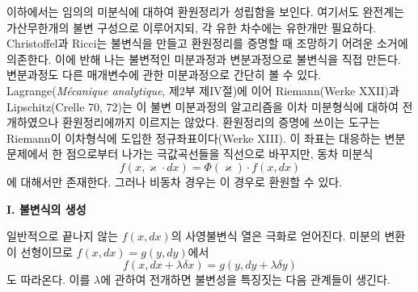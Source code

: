 이하에서는 임의의 미분식에 대하여 \glqq{}환원정리\grqq{}가 성립함을 보인다. 여기서도 완전계는 가산무한개의 불변 구성으로 이루어지되, 각 유한 차수에는 유한개만 필요하다. Christoffel과 Ricci는 불변식을 만들고 환원정리를 증명할 때 조망하기 어려운 소거에 의존한다. 이에 반해 나는 불변적인 미분과정과 변분과정으로 불변식을 직접 만든다. 변분과정도 다른 매개변수에 관한 미분과정으로 간단히 볼 수 있다. Lagrange(\emph{Mécanique analytique}, 제2부 제IV절)에 이어 Riemann(Werke XXII)과 Lipschitz(Crelle 70, 72)는 이 불변 미분과정의 알고리즘을 이차 미분형식에 대하여 전개하였으나 환원정리에까지 이르지는 않았다. 환원정리의 증명에 쓰이는 도구는 Riemann이 이차형식에 도입한 \glqq{}정규좌표\grqq{}이다(Werke XIII). 이 좌표는 대응하는 변분문제에서 한 점으로부터 나가는 극값곡선들을 직선으로 바꾸지만, 동차 미분식
\[
f(x,\varkappa\cdot dx)=\Phi(\varkappa)\cdot f(x,dx)
\]
에 대해서만 존재한다. 그러나 비동차 경우는 이 경우로 환원할 수 있다.

\begin{center}
\textbf{I. 불변식의 생성}
\end{center}

일반적으로 끝나지 않는 \(f(x,dx)\)의 사영불변식 열은 극화로 얻어진다. 미분의 변환이 선형이므로 \(f(x,dx)=g(y,dy)\)에서
\[
f(x,dx+\lambda\delta x)=g(y,dy+\lambda\delta y)
\]
도 따라온다. 이를 \(\lambda\)에 관하여 전개하면 불변성을 특징짓는 다음 관계들이 생긴다.

